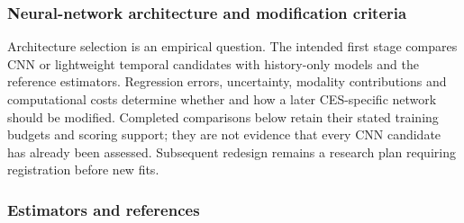 \documentclass[11pt,a4paper]{article}
\begin{document}
\subsubsection{Neural-network architecture and modification criteria}
Architecture selection is an empirical question. The intended first stage compares CNN or lightweight temporal candidates with history-only models and the reference estimators. Regression errors, uncertainty, modality contributions and computational costs determine whether and how a later CES-specific network should be modified. Completed comparisons below retain their stated training budgets and scoring support; they are not evidence that every CNN candidate has already been assessed. Subsequent redesign remains a research plan requiring registration before new fits.

\subsubsection{Estimators and references}
\label{sec:methods:est}
\end{document}
